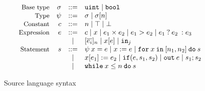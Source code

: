 \begin{figure}
  \footnotesize
  \[
  \begin{array}{rrcl}
    \text{\small{Base type}} & \sigma &::=& {\mathtt{uint}} \mid {\ensuremath{\mathtt{bool}}}\\
    \text{\small{Type}} & \psi &::=& \sigma \mid \sigma[n]\\
    \text{\small{Constant}} & c &::=& n \mid \top \mid \bot\\
    \text{\small{Expression}} & e &::=& c \mid x \mid e_{1} \times e_{2} \mid e_{1} > e_{2} \mid {{e_{1}}\:?\:{e_{2}}\::{e_{3}}}\\
    & &\mid& [\overline{e_{i}}]_{n} \mid x[e] \mid {\ensuremath{\mathtt{in}}}_{j}\\
    \text{\small{Statement}} & s &::=& \psi\:x = e \mid x := e \mid {\ensuremath{\mathtt{for}}}\:{x}\:{\mathtt{in}}\:[{n_{1}}, {n_{2}}]\:{\mathtt{do}}\:{s}\\
    & & \mid& x[e_{1}] := e_{2} \mid {\ensuremath{\mathtt{if}}}({e}, {s_{1}}, {s_{2}}) \mid {\ensuremath{\mathtt{out}}}\:e \mid s_{1}; s_{2}\\
    & & \mid& {\mathtt{while}}\:{x} \leq {n}\:{\mathtt{do}}\:{s}
  \end{array}
  \]
\caption{Source language syntax}
\label{fig:srclang}
\end{figure}

